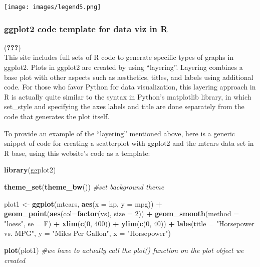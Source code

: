 \documentclass[]{book}
\newenvironment{Shaded}{\begin{snugshade}}{\end{snugshade}}
\newcommand{\CommentTok}[1]{\textcolor[rgb]{0.56,0.35,0.01}{\textit{#1}}}
\newcommand{\DataTypeTok}[1]{\textcolor[rgb]{0.13,0.29,0.53}{#1}}
\newcommand{\DecValTok}[1]{\textcolor[rgb]{0.00,0.00,0.81}{#1}}
\newcommand{\KeywordTok}[1]{\textcolor[rgb]{0.13,0.29,0.53}{\textbf{#1}}}
\newcommand{\NormalTok}[1]{#1}
\newcommand{\OperatorTok}[1]{\textcolor[rgb]{0.81,0.36,0.00}{\textbf{#1}}}
\newcommand{\StringTok}[1]{\textcolor[rgb]{0.31,0.60,0.02}{#1}}
\begin{document}
\texttt{[image: images/legend5.png]}

\hypertarget{ggplot2-code-template-for-data-viz-in-r}{%
\subsubsection{ggplot2 code template for data viz in R}\label{ggplot2-code-template-for-data-viz-in-r}}

({\textbf{???}})\\
This site includes full sets of R code to generate specific types of graphs in ggplot2. Plots in ggplot2 are created by using ``layering''. Layering combines a base plot with other aspects such as aesthetics, titles, and labels using additional code. For those who favor Python for data visualization, this layering approach in R is actually quite similar to the syntax in Python's matplotlib library, in which set\_style and specifying the axes labels and title are done separately from the code that generates the plot itself.

To provide an example of the ``layering'' mentioned above, here is a generic snippet of code for creating a scatterplot with ggplot2 and the mtcars data set in R base, using this website's code as a template:

\begin{Shaded}
\begin{Highlighting}[]
\KeywordTok{library}\NormalTok{(ggplot2)}

\KeywordTok{theme_set}\NormalTok{(}\KeywordTok{theme_bw}\NormalTok{())  }\CommentTok{#set background theme}

\NormalTok{plot1 <-}\StringTok{ }\KeywordTok{ggplot}\NormalTok{(mtcars, }\KeywordTok{aes}\NormalTok{(}\DataTypeTok{x =}\NormalTok{ hp, }\DataTypeTok{y =}\NormalTok{ mpg)) }\OperatorTok{+}\StringTok{ }\KeywordTok{geom_point}\NormalTok{(}\KeywordTok{aes}\NormalTok{(}\DataTypeTok{col=}\KeywordTok{factor}\NormalTok{(vs), }\DataTypeTok{size =} \DecValTok{2}\NormalTok{)) }\OperatorTok{+}\StringTok{ }\KeywordTok{geom_smooth}\NormalTok{(}\DataTypeTok{method =} \StringTok{"loess"}\NormalTok{, }\DataTypeTok{se =}\NormalTok{ F) }\OperatorTok{+}\StringTok{ }\KeywordTok{xlim}\NormalTok{(}\KeywordTok{c}\NormalTok{(}\DecValTok{0}\NormalTok{, }\DecValTok{400}\NormalTok{)) }\OperatorTok{+}\StringTok{ }\KeywordTok{ylim}\NormalTok{(}\KeywordTok{c}\NormalTok{(}\DecValTok{0}\NormalTok{, }\DecValTok{40}\NormalTok{)) }\OperatorTok{+}\StringTok{ }\KeywordTok{labs}\NormalTok{(}\DataTypeTok{title =} \StringTok{"Horsepower vs. MPG"}\NormalTok{, }\DataTypeTok{y =} \StringTok{"Miles Per Gallon"}\NormalTok{, }\DataTypeTok{x =} \StringTok{"Horsepower"}\NormalTok{)}

\KeywordTok{plot}\NormalTok{(plot1)  }\CommentTok{#we have to actually call the plot() function on the plot object we created}
\end{Highlighting}
\end{Shaded}
\end{document}
